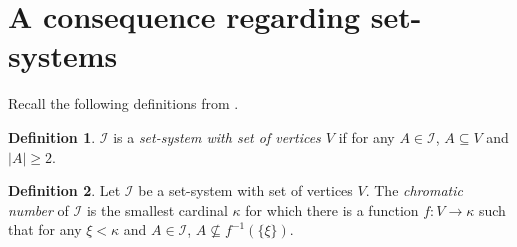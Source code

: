 \documentclass[12pt]{amsart}
\theoremstyle{definition}
\newtheorem{definition}{Definition}[section]
\theoremstyle{plain}
\theoremstyle{plain}
\DeclareMathOperator{\cf}{cf}
\DeclareMathOperator{\cof}{cof}
\DeclareMathOperator{\acc}{acc}
\begin{document}
%
%
%
%
%
%
%

\section{A consequence regarding set-systems}

Recall the following definitions from \cite{ErdosGalvinHajnal}.

\begin{definition}\label{defintion: set-systems}
$\mathcal{I}$ is a \emph{set-system with set of vertices $V$} if for any $A\in \mathcal{I}$, $A\subseteq V$ and $|A|\geq 2$.
\end{definition}

\begin{definition}\label{definition: chromatic}
Let $\mathcal{I}$ be a set-system with set of vertices $V$. The \emph{chromatic number} of $\mathcal{I}$ is the smallest cardinal $\kappa$ for which there is a function $f: V\to \kappa$ such that for any $\xi<\kappa$ and $A\in \mathcal{I}$, $A\not\subseteq f^{-1}(\{\xi\})$.
\end{definition}
\end{document}
